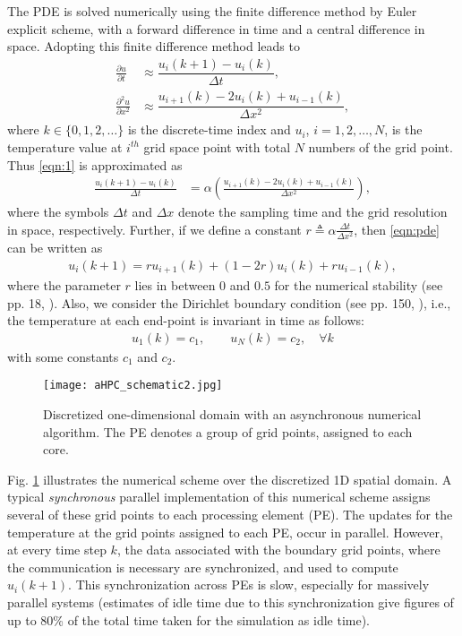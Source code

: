 \documentclass[1p]{elsarticle}
\begin{document}
The PDE is solved numerically using the finite difference method by Euler explicit scheme, with a forward difference in time and a central difference in space. Adopting this finite difference method leads to
\begin{align*}
\frac{\partial u}{\partial t} &\approx \dfrac{u_{i}(k+1) - u_{i}(k)}{\Delta t},\\
\frac{\partial^2 u}{\partial x^2} &\approx \dfrac{u_{i+1}(k) - 2u_{i}(k) + u_{i-1}(k)}{\Delta x^2},
\end{align*}
where $k\in\{0,1,2,\hdots\}$ is the discrete-time index and $u_i$, $i=1,2,\hdots, N$, is the temperature value at $i^{th}$ grid space point with total $N$ numbers of the grid point. Thus \eqref{eqn:1} is approximated as 
\begin{align}
\frac{u_{i}(k+1) - u_{i}(k)}{\Delta t} &= \alpha\left(\frac{u_{i+1}(k) - 2u_{i}(k) + u_{i-1}(k)}{\Delta x^2}\right),\label{eqn:pde}
\end{align}
where the symbols $\Delta t$ and $\Delta x$ denote the sampling time and the grid resolution in space, respectively. Further, if we define a constant $ r\triangleq\alpha\frac{\Delta t}{\Delta x^2}$, then \eqref{eqn:pde} can be written as 
\begin{align}
u_{i}(k+1) = ru_{i+1}(k) + (1-2r)u_{i}(k) + ru_{i-1}(k),\label{eqn:sync}
\end{align}
where the parameter $r$ lies in between $0$ and $0.5$ for the numerical stability (see pp. 18, \citep{smith1985numerical}). 
Also, we consider the Dirichlet boundary condition (see pp. 150, \citep{pletcher2012computational}), i.e., the temperature at each end-point is invariant in time as follows:
\begin{align*}
u_1(k) = c_1,\qquad u_N(k) = c_2, \quad \forall k
\end{align*}
with some constants $c_1$ and $c_2$.

\begin{figure}[h!]
\begin{center}
\texttt{[image: aHPC\_schematic2.jpg]}
\caption{Discretized one-dimensional domain with an asynchronous numerical algorithm. The PE denotes a group of grid points, assigned to each core.}\label{fig.0}
\end{center}
\end{figure}
Fig. \ref{fig.0} illustrates the numerical scheme over the discretized 1D spatial domain. A typical \textit{synchronous} parallel implementation of this numerical scheme  assigns several of these grid points to each processing element (PE). The updates for the temperature at the grid points assigned to each PE, occur in parallel. However, at every time step $k$, the data associated with the boundary grid points, where the communication is necessary are synchronized, and used to compute $u_i(k+1)$. This synchronization across PEs is slow, especially for massively parallel systems (estimates of idle time due to this synchronization give figures of up to 80\% of the total time taken for the simulation as idle time). 
\end{document}
